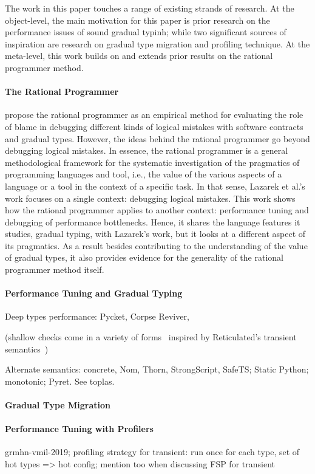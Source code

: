 


The work in this paper touches a range of existing strands of research. At
the object-level, the main motivation for this paper is prior research on
the performance issues of sound gradual typinh; while two significant
sources of inspiration are research on gradual type migration and
profiling technique.  At the meta-level, this work builds on and extends
prior results on the rational programmer method.   

\paragraph{The Rational Programmer}

 \citep{lksfd-popl-2020,lgfd-icfp-2021} propose the rational programmer as
 an empirical method for evaluating the role of blame in debugging
 different kinds of logical mistakes with software contracts and gradual types. However,
 the ideas behind the rational programmer go beyond debugging logical
 mistakes. In essence, the rational programmer is a general methodological
 framework for the systematic investigation of the pragmatics of
 programming languages and tool, i.e., the value of the various aspects of a
 language or a tool in the context of a specific task. In that sense,
 Lazarek et al.'s work focuses on a single context: debugging logical
 mistakes. This work shows how the rational programmer applies to
 another context: performance tuning and debugging of performance
 bottlenecks. Hence, it shares the language features
 it studies, gradual typing, with Lazarek's work, but it looks at a different aspect of its
 pragmatics. As a result besides contributing to the understanding of the
 value of gradual types, it also provides evidence for the generality of
 the rational programmer method itself.  

\paragraph{Performance Tuning and Gradual Typing} 

Deep types performance: Pycket, Corpse Reviver,

(shallow
checks come in a variety of
forms~\cite{grmhn-vmil-2019,rmhn-ecoop-2019,glfd-pj-2022,lgmvpk-pj-2023}
inspired by Reticulated's transient
semantics~\cite{vksb-dls-2014,vss-popl-2017,v-thesis-2019})

Alternate semantics: concrete, Nom, Thorn, StrongScript, SafeTS;
Static Python; monotonic; Pyret. See toplas.



\paragraph{Gradual Type Migration}



\paragraph{Performance Tuning with Profilers}

grmhn-vmil-2019;
profiling strategy for transient: run once for each type, set of hot types => hot config;
mention too when discussing FSP for transient






